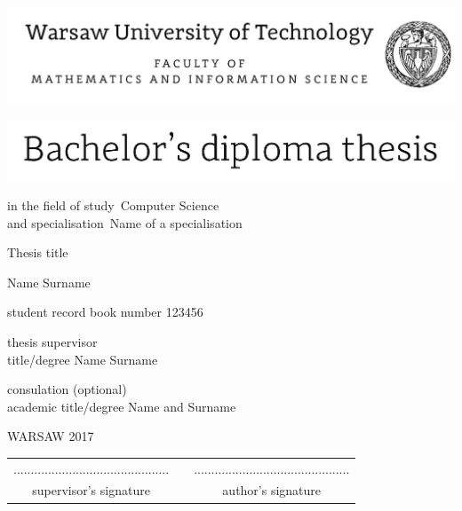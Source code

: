\documentclass[12pt,twoside,a4paper]{article}
\def\discipline{Computer Science}
\def\spec{Name of a specialisation}
\def\title{Thesis title}
\def\author{Name Surname}
\def\supervisor{title/degree Name Surname}
\def\album{123456}
\def\year{2017}
\begin{document}
\sloppy
\pagestyle{empty}


\hspace{-20pt}\includegraphics[scale=1.]{wut}

\begin{center}
\vspace{70pt}


\includegraphics[scale=1.]{bachelor} %

{ \arial
in the field of study~\discipline \\
and specialisation~\spec

\vspace{30pt}
{\arial \large \title}

\vspace{50pt}

{\arial \huge \author}

\vspace{5pt}

student record book number \album

\vspace{40pt}

thesis supervisor \\
{\arial \supervisor}

\vspace{15pt}
 
consulation (optional)  \\
{\arial academic title/degree Name and Surname}

 \vfill
WARSAW \year \\
}
\end{center}


\newpage
\null

\vfill

\begin{center}
\begin{tabular}[t]{ccc}
............................................. & \hspace*{100pt} & .............................................\\
supervisor's signature & \hspace*{100pt} & author's signature
\end{tabular}
\end{center}
\end{document}
